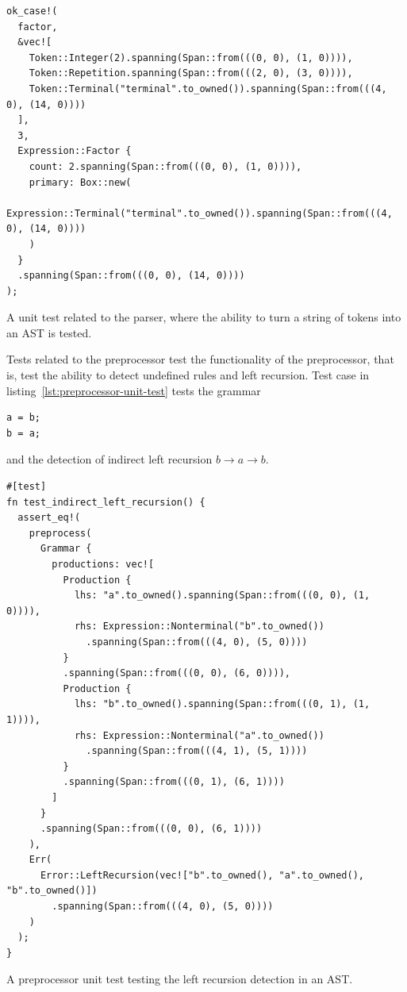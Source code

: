 \documentclass[english,engineering]{wizthesis}
\begin{document}
\begin{listing}[H]
  \begin{verbatim}
ok_case!(
  factor,
  &vec![
    Token::Integer(2).spanning(Span::from(((0, 0), (1, 0)))),
    Token::Repetition.spanning(Span::from(((2, 0), (3, 0)))),
    Token::Terminal("terminal".to_owned()).spanning(Span::from(((4, 0), (14, 0))))
  ],
  3,
  Expression::Factor {
    count: 2.spanning(Span::from(((0, 0), (1, 0)))),
    primary: Box::new(
      Expression::Terminal("terminal".to_owned()).spanning(Span::from(((4, 0), (14, 0))))
    )
  }
  .spanning(Span::from(((0, 0), (14, 0))))
);
  \end{verbatim}
  \caption{A unit test related to the parser, where the ability to turn a string
  of tokens into an AST is tested.}
  \label{lst:parser-unit-test}
\end{listing}

Tests related to the preprocessor test the functionality of the preprocessor,
that is, test the ability to detect undefined rules and left recursion. Test
case in listing~\ref{lst:preprocessor-unit-test} tests the grammar
\begin{verbatim}
a = b;
b = a;
\end{verbatim}
and the detection of indirect left recursion $b \rightarrow a \rightarrow b$.

\begin{listing}[H]
  \begin{verbatim}
#[test]
fn test_indirect_left_recursion() {
  assert_eq!(
    preprocess(
      Grammar {
        productions: vec![
          Production {
            lhs: "a".to_owned().spanning(Span::from(((0, 0), (1, 0)))),
            rhs: Expression::Nonterminal("b".to_owned())
              .spanning(Span::from(((4, 0), (5, 0))))
          }
          .spanning(Span::from(((0, 0), (6, 0)))),
          Production {
            lhs: "b".to_owned().spanning(Span::from(((0, 1), (1, 1)))),
            rhs: Expression::Nonterminal("a".to_owned())
              .spanning(Span::from(((4, 1), (5, 1))))
          }
          .spanning(Span::from(((0, 1), (6, 1))))
        ]
      }
      .spanning(Span::from(((0, 0), (6, 1))))
    ),
    Err(
      Error::LeftRecursion(vec!["b".to_owned(), "a".to_owned(), "b".to_owned()])
        .spanning(Span::from(((4, 0), (5, 0))))
    )
  );
}
  \end{verbatim}
  \caption{A preprocessor unit test testing the left recursion detection in an
  AST.}
  \label{lst:preprocessor-unit-test}
\end{listing}
\end{document}
